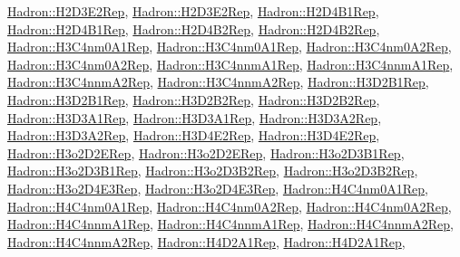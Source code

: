 \mbox{\hyperlink{structHadron_1_1H2D3E2Rep}{Hadron\+::\+H2\+D3\+E2\+Rep}}, \mbox{\hyperlink{structHadron_1_1H2D3E2Rep}{Hadron\+::\+H2\+D3\+E2\+Rep}}, \mbox{\hyperlink{structHadron_1_1H2D4B1Rep}{Hadron\+::\+H2\+D4\+B1\+Rep}}, \mbox{\hyperlink{structHadron_1_1H2D4B1Rep}{Hadron\+::\+H2\+D4\+B1\+Rep}}, \mbox{\hyperlink{structHadron_1_1H2D4B2Rep}{Hadron\+::\+H2\+D4\+B2\+Rep}}, \mbox{\hyperlink{structHadron_1_1H2D4B2Rep}{Hadron\+::\+H2\+D4\+B2\+Rep}}, \mbox{\hyperlink{structHadron_1_1H3C4nm0A1Rep}{Hadron\+::\+H3\+C4nm0\+A1\+Rep}}, \mbox{\hyperlink{structHadron_1_1H3C4nm0A1Rep}{Hadron\+::\+H3\+C4nm0\+A1\+Rep}}, \mbox{\hyperlink{structHadron_1_1H3C4nm0A2Rep}{Hadron\+::\+H3\+C4nm0\+A2\+Rep}}, \mbox{\hyperlink{structHadron_1_1H3C4nm0A2Rep}{Hadron\+::\+H3\+C4nm0\+A2\+Rep}}, \mbox{\hyperlink{structHadron_1_1H3C4nnmA1Rep}{Hadron\+::\+H3\+C4nnm\+A1\+Rep}}, \mbox{\hyperlink{structHadron_1_1H3C4nnmA1Rep}{Hadron\+::\+H3\+C4nnm\+A1\+Rep}}, \mbox{\hyperlink{structHadron_1_1H3C4nnmA2Rep}{Hadron\+::\+H3\+C4nnm\+A2\+Rep}}, \mbox{\hyperlink{structHadron_1_1H3C4nnmA2Rep}{Hadron\+::\+H3\+C4nnm\+A2\+Rep}}, \mbox{\hyperlink{structHadron_1_1H3D2B1Rep}{Hadron\+::\+H3\+D2\+B1\+Rep}}, \mbox{\hyperlink{structHadron_1_1H3D2B1Rep}{Hadron\+::\+H3\+D2\+B1\+Rep}}, \mbox{\hyperlink{structHadron_1_1H3D2B2Rep}{Hadron\+::\+H3\+D2\+B2\+Rep}}, \mbox{\hyperlink{structHadron_1_1H3D2B2Rep}{Hadron\+::\+H3\+D2\+B2\+Rep}}, \mbox{\hyperlink{structHadron_1_1H3D3A1Rep}{Hadron\+::\+H3\+D3\+A1\+Rep}}, \mbox{\hyperlink{structHadron_1_1H3D3A1Rep}{Hadron\+::\+H3\+D3\+A1\+Rep}}, \mbox{\hyperlink{structHadron_1_1H3D3A2Rep}{Hadron\+::\+H3\+D3\+A2\+Rep}}, \mbox{\hyperlink{structHadron_1_1H3D3A2Rep}{Hadron\+::\+H3\+D3\+A2\+Rep}}, \mbox{\hyperlink{structHadron_1_1H3D4E2Rep}{Hadron\+::\+H3\+D4\+E2\+Rep}}, \mbox{\hyperlink{structHadron_1_1H3D4E2Rep}{Hadron\+::\+H3\+D4\+E2\+Rep}}, \mbox{\hyperlink{structHadron_1_1H3o2D2ERep}{Hadron\+::\+H3o2\+D2\+E\+Rep}}, \mbox{\hyperlink{structHadron_1_1H3o2D2ERep}{Hadron\+::\+H3o2\+D2\+E\+Rep}}, \mbox{\hyperlink{structHadron_1_1H3o2D3B1Rep}{Hadron\+::\+H3o2\+D3\+B1\+Rep}}, \mbox{\hyperlink{structHadron_1_1H3o2D3B1Rep}{Hadron\+::\+H3o2\+D3\+B1\+Rep}}, \mbox{\hyperlink{structHadron_1_1H3o2D3B2Rep}{Hadron\+::\+H3o2\+D3\+B2\+Rep}}, \mbox{\hyperlink{structHadron_1_1H3o2D3B2Rep}{Hadron\+::\+H3o2\+D3\+B2\+Rep}}, \mbox{\hyperlink{structHadron_1_1H3o2D4E3Rep}{Hadron\+::\+H3o2\+D4\+E3\+Rep}}, \mbox{\hyperlink{structHadron_1_1H3o2D4E3Rep}{Hadron\+::\+H3o2\+D4\+E3\+Rep}}, \mbox{\hyperlink{structHadron_1_1H4C4nm0A1Rep}{Hadron\+::\+H4\+C4nm0\+A1\+Rep}}, \mbox{\hyperlink{structHadron_1_1H4C4nm0A1Rep}{Hadron\+::\+H4\+C4nm0\+A1\+Rep}}, \mbox{\hyperlink{structHadron_1_1H4C4nm0A2Rep}{Hadron\+::\+H4\+C4nm0\+A2\+Rep}}, \mbox{\hyperlink{structHadron_1_1H4C4nm0A2Rep}{Hadron\+::\+H4\+C4nm0\+A2\+Rep}}, \mbox{\hyperlink{structHadron_1_1H4C4nnmA1Rep}{Hadron\+::\+H4\+C4nnm\+A1\+Rep}}, \mbox{\hyperlink{structHadron_1_1H4C4nnmA1Rep}{Hadron\+::\+H4\+C4nnm\+A1\+Rep}}, \mbox{\hyperlink{structHadron_1_1H4C4nnmA2Rep}{Hadron\+::\+H4\+C4nnm\+A2\+Rep}}, \mbox{\hyperlink{structHadron_1_1H4C4nnmA2Rep}{Hadron\+::\+H4\+C4nnm\+A2\+Rep}}, \mbox{\hyperlink{structHadron_1_1H4D2A1Rep}{Hadron\+::\+H4\+D2\+A1\+Rep}}, \mbox{\hyperlink{structHadron_1_1H4D2A1Rep}{Hadron\+::\+H4\+D2\+A1\+Rep}}, 